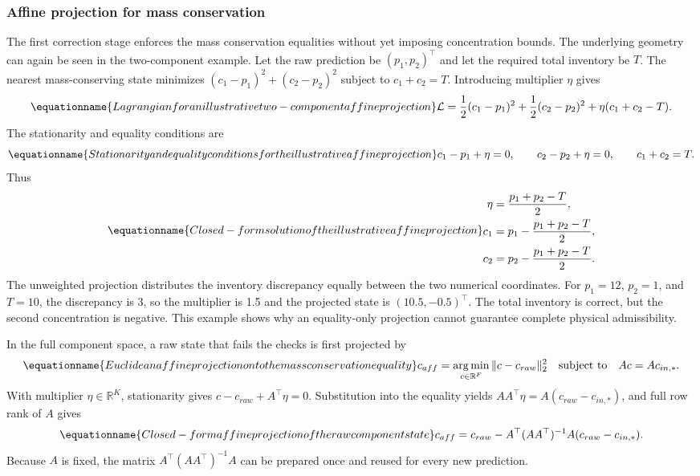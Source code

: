 \subsubsection{Affine projection for mass conservation}

The first correction stage enforces the mass conservation equalities without yet imposing concentration bounds. The underlying geometry can again be seen in the two-component example. Let the raw prediction be \((p_1,p_2)^\top\) and let the required total inventory be \(T\). The nearest mass-conserving state minimizes \((c_1-p_1)^2+(c_2-p_2)^2\) subject to \(c_1+c_2=T\). Introducing multiplier \(\eta\) gives
\begin{equation}
\equationname{Lagrangian for an illustrative two-component affine projection}
\label{eq:icsor_scalar_projection_lagrangian}
\mathcal{L}=\frac{1}{2}(c_1-p_1)^2+
\frac{1}{2}(c_2-p_2)^2+\eta(c_1+c_2-T).
\end{equation}
The stationarity and equality conditions are
\begin{equation}
\equationname{Stationarity and equality conditions for the illustrative affine projection}
\label{eq:icsor_scalar_projection_conditions}
c_1-p_1+\eta=0,
\qquad c_2-p_2+\eta=0,
\qquad c_1+c_2=T.
\end{equation}
Thus
\begin{equation}
\equationname{Closed-form solution of the illustrative affine projection}
\label{eq:icsor_scalar_projection_solution}
\begin{aligned}
\eta&=\frac{p_1+p_2-T}{2},\\
c_1&=p_1-\frac{p_1+p_2-T}{2},\\
c_2&=p_2-\frac{p_1+p_2-T}{2}.
\end{aligned}
\end{equation}
The unweighted projection distributes the inventory discrepancy equally between the two numerical coordinates. For \(p_1=12\), \(p_2=1\), and \(T=10\), the discrepancy is 3, so the multiplier is 1.5 and the projected state is \((10.5,-0.5)^\top\). The total inventory is correct, but the second concentration is negative. This example shows why an equality-only projection cannot guarantee complete physical admissibility.

In the full component space, a raw state that fails the checks is first projected by
\begin{equation}
\equationname{Euclidean affine projection onto the mass conservation equality}
\label{eq:icsor_affine_problem}
c_{aff}=\mathop{\arg\min}_{c\in\mathbb{R}^{F}}\|c-c_{raw}\|_2^2
\quad\text{subject to}\quad Ac=Ac_{in,*}.
\end{equation}
With multiplier \(\eta\in\mathbb{R}^{K}\), stationarity gives \(c-c_{raw}+A^\top\eta=0\). Substitution into the equality yields \(AA^\top\eta=A(c_{raw}-c_{in,*})\), and full row rank of \(A\) gives
\begin{equation}
\equationname{Closed-form affine projection of the raw component state}
\label{eq:icsor_affine_solution}
c_{aff}=c_{raw}-A^\top(AA^\top)^{-1}A(c_{raw}-c_{in,*}).
\end{equation}
Because \(A\) is fixed, the matrix \(A^\top(AA^\top)^{-1}A\) can be prepared once and reused for every new prediction.

